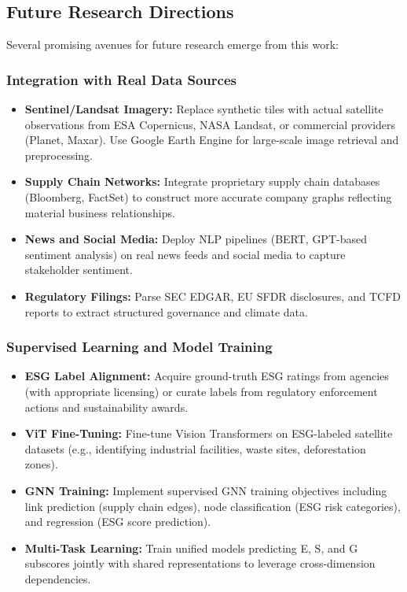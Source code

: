 \subsection{Future Research Directions}

Several promising avenues for future research emerge from this work:

\subsubsection{Integration with Real Data Sources}

\begin{itemize}
\item \textbf{Sentinel/Landsat Imagery:} Replace synthetic tiles with actual satellite observations from ESA Copernicus, NASA Landsat, or commercial providers (Planet, Maxar). Use Google Earth Engine for large-scale image retrieval and preprocessing.
\item \textbf{Supply Chain Networks:} Integrate proprietary supply chain databases (Bloomberg, FactSet) to construct more accurate company graphs reflecting material business relationships.
\item \textbf{News and Social Media:} Deploy NLP pipelines (BERT, GPT-based sentiment analysis) on real news feeds and social media to capture stakeholder sentiment.
\item \textbf{Regulatory Filings:} Parse SEC EDGAR, EU SFDR disclosures, and TCFD reports to extract structured governance and climate data.
\end{itemize}

\subsubsection{Supervised Learning and Model Training}

\begin{itemize}
\item \textbf{ESG Label Alignment:} Acquire ground-truth ESG ratings from agencies (with appropriate licensing) or curate labels from regulatory enforcement actions and sustainability awards.
\item \textbf{ViT Fine-Tuning:} Fine-tune Vision Transformers on ESG-labeled satellite datasets (e.g., identifying industrial facilities, waste sites, deforestation zones).
\item \textbf{GNN Training:} Implement supervised GNN training objectives including link prediction (supply chain edges), node classification (ESG risk categories), and regression (ESG score prediction).
\item \textbf{Multi-Task Learning:} Train unified models predicting E, S, and G subscores jointly with shared representations to leverage cross-dimension dependencies.
\end{itemize}

